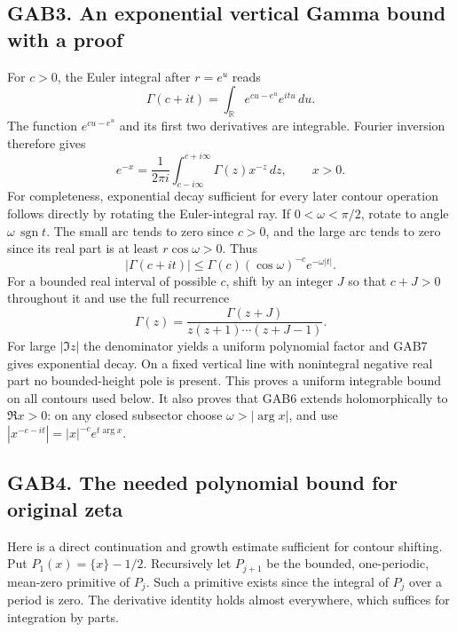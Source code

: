 \documentclass[
  10pt,
  a4paper,
]{article}
\begin{document}
\subsection{GAB3. An exponential vertical Gamma bound with a
proof}\label{gab3.-an-exponential-vertical-gamma-bound-with-a-proof}

For \(c>0\), the Euler integral after \(r=e^u\) reads \[
 \Gamma(c+it)=\int_{\mathbb R}e^{cu-e^u}e^{itu}\,du.
\] The function \(e^{cu-e^u}\) and its first two derivatives are
integrable. Fourier inversion therefore gives \[
 e^{-x}=\frac1{2\pi i}\int_{c-i\infty}^{c+i\infty}
                    \Gamma(z)x^{-z}\,dz,\qquad x>0.
                                                        \tag{GAB6}
\] For completeness, exponential decay sufficient for every later
contour operation follows directly by rotating the Euler-integral ray.
If \(0<\omega<\pi/2\), rotate to angle \(\omega\,\operatorname{sgn}t\).
The small arc tends to zero since \(c>0\), and the large arc tends to
zero since its real part is at least \(r\cos\omega>0\). Thus \[
 |\Gamma(c+it)|
 \le \Gamma(c)(\cos\omega)^{-c}e^{-\omega|t|}.
                                                        \tag{GAB7}
\] For a bounded real interval of possible \(c\), shift by an integer
\(J\) so that \(c+J>0\) throughout it and use the full recurrence \[
 \Gamma(z)=\frac{\Gamma(z+J)}
                   {z(z+1)\cdots(z+J-1)}.               \tag{GAB8}
\] For large \(|\Im z|\) the denominator yields a uniform polynomial
factor and GAB7 gives exponential decay. On a fixed vertical line with
nonintegral negative real part no bounded-height pole is present. This
proves a uniform integrable bound on all contours used below. It also
proves that GAB6 extends holomorphically to \(\Re x>0\): on any closed
subsector choose \(\omega>|\arg x|\), and use
\(|x^{-c-it}|=|x|^{-c}e^{t\arg x}\).

\subsection{GAB4. The needed polynomial bound for original
zeta}\label{gab4.-the-needed-polynomial-bound-for-original-zeta}

Here is a direct continuation and growth estimate sufficient for contour
shifting. Put \(P_1(x)=\{x\}-1/2\). Recursively let \(P_{j+1}\) be the
bounded, one-periodic, mean-zero primitive of \(P_j\). Such a primitive
exists since the integral of \(P_j\) over a period is zero. The
derivative identity holds almost everywhere, which suffices for
integration by parts.
\end{document}
